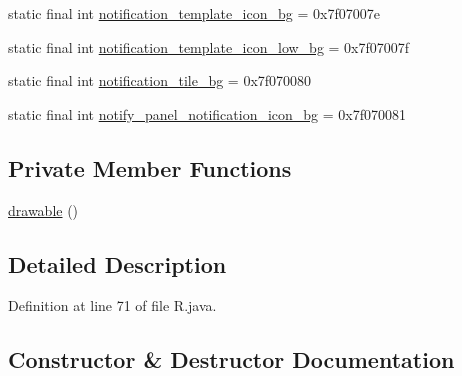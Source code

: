 \begin{DoxyCompactItemize}
\item 
static final int \mbox{\hyperlink{classandroid_1_1support_1_1graphics_1_1drawable_1_1animated_1_1_r_1_1drawable_a47d89cad868f73d03a6a6f09466f7757}{notification\+\_\+template\+\_\+icon\+\_\+bg}} = 0x7f07007e
\item 
static final int \mbox{\hyperlink{classandroid_1_1support_1_1graphics_1_1drawable_1_1animated_1_1_r_1_1drawable_a7338e51e18b9d094b0084c7844db9876}{notification\+\_\+template\+\_\+icon\+\_\+low\+\_\+bg}} = 0x7f07007f
\item 
static final int \mbox{\hyperlink{classandroid_1_1support_1_1graphics_1_1drawable_1_1animated_1_1_r_1_1drawable_a4953f710df010071750b666cb85788fa}{notification\+\_\+tile\+\_\+bg}} = 0x7f070080
\item 
static final int \mbox{\hyperlink{classandroid_1_1support_1_1graphics_1_1drawable_1_1animated_1_1_r_1_1drawable_afd5a7eb941d015ffa1256e11549c45e1}{notify\+\_\+panel\+\_\+notification\+\_\+icon\+\_\+bg}} = 0x7f070081
\end{DoxyCompactItemize}
\subsection*{Private Member Functions}
\begin{DoxyCompactItemize}
\item 
\mbox{\hyperlink{classandroid_1_1support_1_1graphics_1_1drawable_1_1animated_1_1_r_1_1drawable_a4211c749597c81b717eb261cd208dc47}{drawable}} ()
\end{DoxyCompactItemize}


\subsection{Detailed Description}


Definition at line 71 of file R.\+java.



\subsection{Constructor \& Destructor Documentation}
\mbox{\label{classandroid_1_1support_1_1graphics_1_1drawable_1_1animated_1_1_r_1_1drawable_a4211c749597c81b717eb261cd208dc47}} 
